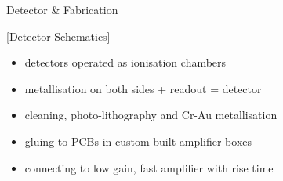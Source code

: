 \begin{block}{Detector \& Fabrication}
	
	[Detector Schematics]
	
	\begin{itemize}
		\item detectors operated as ionisation chambers
		\item metallisation on both sides + readout = detector
	\end{itemize}
	
	
	\begin{itemize}
		\item cleaning, photo-lithography and Cr-Au metallisation
		\item gluing to PCBs in custom built amplifier boxes
		\item connecting to low gain, fast amplifier with  rise time
	\end{itemize}



\end{block}
